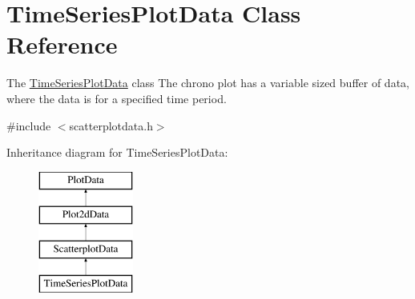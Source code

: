 \hypertarget{class_time_series_plot_data}{\section{\-Time\-Series\-Plot\-Data \-Class \-Reference}
\label{class_time_series_plot_data}
}


\-The \hyperlink{class_time_series_plot_data}{\-Time\-Series\-Plot\-Data} class \-The chrono plot has a variable sized buffer of data, where the data is for a specified time period.  




{\ttfamily \#include $<$scatterplotdata.\-h$>$}

\-Inheritance diagram for \-Time\-Series\-Plot\-Data\-:\begin{figure}[H]
\begin{center}
\leavevmode
\includegraphics[height=4.000000cm]{class_time_series_plot_data}
\end{center}
\end{figure}
